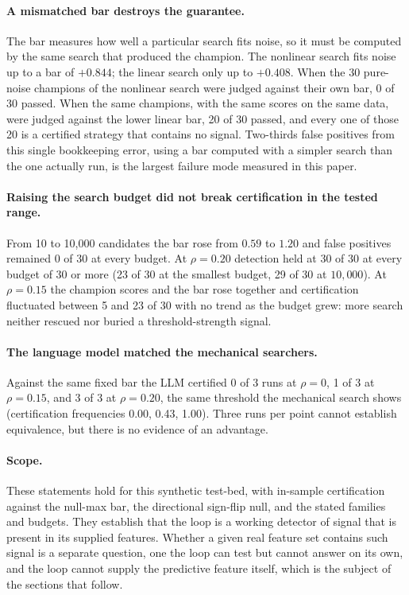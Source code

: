 \documentclass[11pt]{article}
\begin{document}
\paragraph{A mismatched bar destroys the guarantee.} The bar measures how well a particular search fits
noise, so it must be computed by the same search that produced the champion. The nonlinear search fits
noise up to a bar of $+0.844$; the linear search only up to $+0.408$. When the 30 pure-noise champions
of the nonlinear search were judged against their own bar, 0 of 30 passed. When the same champions, with
the same scores on the same data, were judged against the lower linear bar, 20 of 30 passed, and every
one of those 20 is a certified strategy that contains no signal. Two-thirds false positives from this
single bookkeeping error, using a bar computed with a simpler search than the one actually run, is the
largest failure mode measured in this paper.

\paragraph{Raising the search budget did not break certification in the tested range.} From 10 to
10{,}000 candidates the bar rose from $0.59$ to $1.20$ and false positives remained 0 of 30 at every
budget. At $\rho=0.20$ detection held at 30 of 30 at every budget of 30 or more (23 of 30 at the
smallest budget, 29 of 30 at $10{,}000$). At $\rho=0.15$ the champion scores and the bar rose together
and certification fluctuated between 5 and 23 of 30 with no trend as the budget grew: more search neither
rescued nor buried a threshold-strength signal.

\paragraph{The language model matched the mechanical searchers.} Against the same fixed bar the LLM
certified 0 of 3 runs at $\rho=0$, 1 of 3 at $\rho=0.15$, and 3 of 3 at $\rho=0.20$, the same threshold
the mechanical search shows (certification frequencies 0.00, 0.43, 1.00). Three runs per point cannot
establish equivalence, but there is no evidence of an advantage.

\paragraph{Scope.} These statements hold for this synthetic test-bed, with in-sample certification
against the null-max bar, the directional sign-flip null, and the stated families and budgets. They
establish that the loop is a working detector of signal that is present in its supplied features. Whether
a given real feature set contains such signal is a separate question, one the loop can test but cannot
answer on its own, and the loop cannot supply the predictive feature itself, which is the subject of the
sections that follow.
\end{document}
